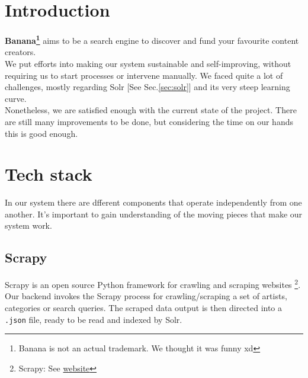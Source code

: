 \documentclass[tikz,14pt]{article}
\newcommand\sitename{Banana\texttrademark}
\begin{document}






\section{Introduction} \label{sec:intro}
\textbf{\sitename\footnote{Banana is not an actual trademark. We thought it was funny xd}} aims to be a search engine to discover and fund your favourite content creators.\\
We put efforts into making our system sustainable and self-improving, without requiring us to start processes or intervene manually. We faced quite a lot of challenges, mostly regarding Solr [See Sec.\ref{sec:solr}] and its very steep learning curve.\\
Nonetheless, we are satisfied enough with the current state of the project. There are still many improvements to be done, but considering the time on our hands this is good enough.\\


\section{Tech stack} \label{sec:stack}
In our system there are dfferent components that operate independently from one another. It's important to gain understanding of the moving pieces that make our system work.

\subsection{Scrapy} \label{sec:scrapy}
Scrapy is an open source Python framework for crawling and scraping websites \footnote{Scrapy: See \href{https://scrapy.org}{website}}. Our backend invokes the Scrapy process for crawling/scraping a set of artists, categories or search queries. The scraped data output is then directed into a \verb|.json| file, ready to be read and indexed by Solr.
\end{document}
